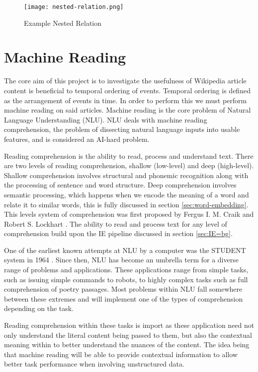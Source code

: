 \documentclass[bsc,frontabs,twoside,singlespacing,parskip,deptreport]{infthesis}     %
\begin{document}
\begin{figure}[H]
  \centering
  \texttt{[image: nested-relation.png]}
  \caption{Example Nested Relation}
  \label{fig:nested-relation}
\end{figure}


\section{Machine Reading}
The core aim of this project is to investigate the usefulness of Wikipedia article content is beneficial to temporal ordering of events.
Temporal ordering is defined as the arrangement of events in time.
In order to perform this we must perform machine reading on said articles.
Machine reading is the core problem of Natural Language Understanding (NLU).
NLU deals with machine reading comprehension, the problem of dissecting natural language inputs into usable features,
and is considered an AI-hard problem.

Reading comprehension is the ability to read, process and understand text.  
There are two levels of reading comprehension, shallow (low-level) and deep (high-level).
Shallow comprehension involves structural and phonemic recognition along with the processing of sentence and  word
structure.
Deep comprehension involves semantic processing, which happens when we encode the meaning of a word and relate it
to similar words, this is fully discussed in section \ref{sec:word-embedding}.
This levels system of comprehension was first proposed by  Fergus I. M. Craik and Robert S. Lockhart \cite{wagner2009beyond}.
The ability to read and process text for any level of comprehension build upon the IE pipeline discussed in section \ref{sec:IE=bg}.

One of the earliest known attempts at NLU by a computer was the STUDENT system in 1964 \cite{russell1995modern}.
Since then, NLU has become an
umbrella term for a diverse range of problems and applications. These applications range from simple tasks, such as
issuing simple commands to robots, to highly complex tasks such as full comprehension of poetry passages.
Most problems within NLU fall somewhere between these extremes and will implement one of the types of comprehension
depending on the task.

Reading comprehension within these tasks is import as these application need not only understand the literal content
being passed to them, but also the contextual meaning within to better understand the nuances of the content.
The idea being that machine reading will be able to provide contextual information to allow better task performance when
involving unstructured data.
\end{document}
